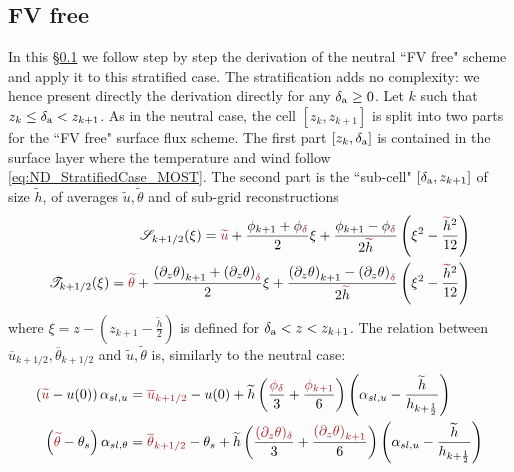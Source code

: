 \subsection{FV free}
\label{sec:ND_StratifiedCase_FVfree}
In this \S \ref{sec:ND_StratifiedCase_FVfree} we follow
step by step the derivation of the neutral ``FV free" scheme and
apply it to this stratified case. The stratification adds no
complexity: we hence present directly the derivation directly for
any $\delta_{\rm a} \geq 0$.
Let $k$ such that $z_k \leq \delta_{\rm a} < z_{k+1}$.
As in the neutral case, the cell $[z_k, z_{k+1}]$ is split
into two parts for the ``FV free" surface flux scheme.
The first part $[z_k,\delta_{\rm a}]$ is contained
in the surface layer where the temperature and wind
follow \eqref{eq:ND_StratifiedCase_MOST}.
The second part is the
``sub-cell" $[\delta_{\rm a}, z_{k+1}]$ of size $\widetilde{h}$, of
averages $\widetilde{u}, \widetilde{\theta}$
and of sub-grid reconstructions
\begin{equation}
\begin{aligned}
	{\cal S}_{k+1/2}(\xi) = \emphase{\widetilde{u}} +
	\frac{\phi_{k+1} + \phi_\emphase{\delta}}{2} \xi
	+ \frac{\phi_{k+1} - \phi_\emphase{\delta}}{2\emphase{\widetilde{\color{black} h}}}
	\left(\xi^2 - \frac{\emphase{\widetilde{\color{black} h}}^2}{12}\right) \\
	{\cal T}_{k+1/2}(\xi) = \emphase{\widetilde{\theta}} +
	\frac{{(\partial_z \theta)}_{k+1} + 
		{(\partial_z \theta)}_\emphase{\delta}}{2} \xi
+ \frac{{(\partial_z \theta)}_{k+1} - {(\partial_z \theta)}_\emphase{\delta}}
	{2\emphase{\widetilde{\color{black} h}}}
	\left(\xi^2 - \frac{\emphase{\widetilde{\color{black} h}}^2}{12}\right)
\end{aligned}
\end{equation}
where $\xi = z - (z_{k+1} - \frac{\widetilde{h}}{2})$ is defined
for $\delta_{\rm a} < z < z_{k+1}$.
The relation between
$\overline{u}_{k+1/2}, \overline{\theta}_{k+1/2}$ and
$\widetilde{u},\widetilde{\theta}$ is, similarly to the neutral case:
\begin{equation}
\begin{aligned}
\label{eq:ND_StratifiedCase_relation_tilde_bar}
	\left(\emphase{\widetilde{u}} - u(0)\right)\alpha_{sl, u}
	&= \emphase{\overline{u}_{k+1/2}} - u(0) + \widetilde{h}
	\left(\frac{\emphase{\phi_\delta}}{3} +
	\frac{\emphase{\phi_{k+1}}}{6}\right)
	\left(\alpha_{sl, u} -
	\frac{\widetilde{h}}{h_{k+\frac{1}{2}}}
	\right)\\
	\left(\emphase{\widetilde{\theta}} - \theta_s\right)
	\alpha_{sl, \theta}
	&= \emphase{\overline{\theta}_{k+1/2}} - \theta_s +
	\widetilde{h}\left(
		\frac{\emphase{(\partial_z \theta)_\delta}}{3} +
		\frac{\emphase{{(\partial_z \theta)}_{k+1}}}{6}
	\right)\left(\alpha_{sl, u} -
	\frac{\widetilde{h}}{h_{k+\frac{1}{2}}}
	\right)
\end{aligned}
\end{equation}
